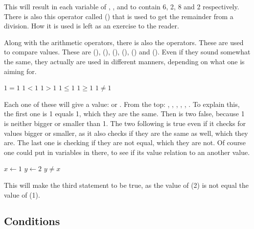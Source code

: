 This will result in each variable of , ,  and  to contain 6, 2, 8 and 2 respectively. There is also this operator called  (\code{\%}) that is used to get the remainder from a division. How it is used is left as an exercise to the reader.

Along with the arithmetic operators, there is also the  operators. These are used to compare values. These are  (\code{==}),  (\code{<}),  (\code{>}),  (\code{<=}),  (\code{>=}) and  (\code{\!\=}). Even if they sound somewhat the same, they actually are used in different manners, depending on what one is aiming for.

\begin{algorithm}[H]
	\begin{algorithmic}[1]
		\State $1 = 1$
		\State $1 < 1$
		\State $1 > 1$
		\State $1 \leq 1$
		\State $1 \geq 1$
		\State $1 \neq 1$
	\end{algorithmic}
\end{algorithm}

Each one of these will give a  value:  or . From the top: , , , , , . To explain this, the first one is 1 equals 1, which they are the same. Then is two false, because 1 is neither bigger or smaller than 1. The two following is true even if it checks for values bigger or smaller, as it also checks if they are the same as well, which they are. The last one is checking if they are not equal, which they are not.
Of course one could put in variables in there, to see if its value relation to an another value.

\begin{algorithm}[H]
	\begin{algorithmic}[1]
		\State $x \gets 1$
		\State $y \gets 2$
		\State $y \neq x$
	\end{algorithmic}
\end{algorithm}

This will make the third statement to be true, as the value of  (2) is not equal the value of  (1).

\subsection{Conditions}

